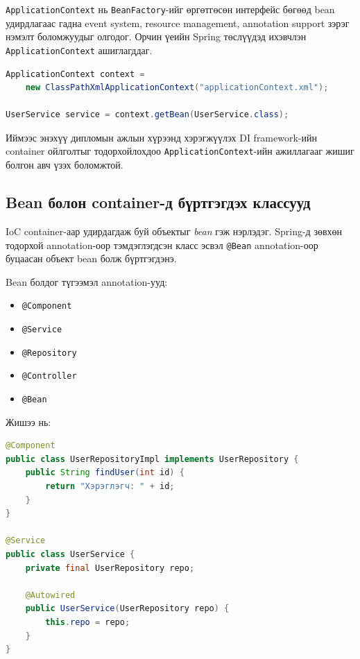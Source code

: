 \texttt{ApplicationContext} нь \texttt{BeanFactory}-ийг өргөтгөсөн интерфейс бөгөөд bean удирдлагаас гадна event system, resource management, annotation support зэрэг нэмэлт боломжуудыг олгодог. Орчин үеийн Spring төслүүдэд ихэвчлэн \texttt{ApplicationContext} ашиглагддаг.

\begin{lstlisting}[language=Java, caption={ApplicationContext ашигласан жишээ}, label={lst:applicationcontext-example}]
ApplicationContext context =
    new ClassPathXmlApplicationContext("applicationContext.xml");

UserService service = context.getBean(UserService.class);
\end{lstlisting}

Иймээс энэхүү дипломын ажлын хүрээнд хэрэгжүүлэх DI framework-ийн container ойлголтыг тодорхойлохдоо \texttt{ApplicationContext}-ийн ажиллагааг жишиг болгон авч үзэх боломжтой.

\subsection{Bean болон container-д бүртгэгдэх классууд}

IoC container-аар удирдагдаж буй объектыг \textit{bean} гэж нэрлэдэг. Spring-д зөвхөн тодорхой annotation-оор тэмдэглэгдсэн класс эсвэл \texttt{@Bean} annotation-оор буцаасан объект bean болж бүртгэгдэнэ.

Bean болдог түгээмэл annotation-ууд:
\begin{itemize}
    \item \texttt{@Component}
    \item \texttt{@Service}
    \item \texttt{@Repository}
    \item \texttt{@Controller}
    \item \texttt{@Bean}
\end{itemize}

Жишээ нь:

\begin{lstlisting}[language=Java, caption={Component болон Service annotation ашигласан жишээ}, label={lst:component-service-example}]
@Component
public class UserRepositoryImpl implements UserRepository {
    public String findUser(int id) {
        return "Хэрэглэгч: " + id;
    }
}

@Service
public class UserService {
    private final UserRepository repo;

    @Autowired
    public UserService(UserRepository repo) {
        this.repo = repo;
    }
}
\end{lstlisting}

